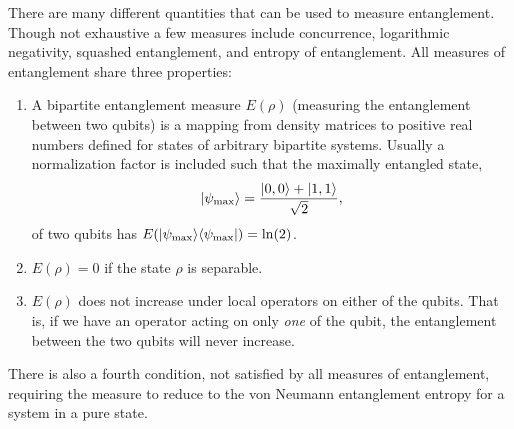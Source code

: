 There are many different quantities that can be used to measure entanglement. Though not exhaustive a few measures include concurrence, logarithmic negativity, squashed entanglement, and entropy of entanglement.
All measures of entanglement share three properties\cite{Plenio2005}:
\begin{enumerate}
\item A bipartite entanglement measure $E(\rho)$ (measuring the entanglement between two qubits) is a mapping from density matrices to positive real numbers defined for states of arbitrary bipartite systems.
Usually a normalization factor is included such that the maximally entangled state,
\begin{equation}
\lvert {\psi_{\rm max}} \rangle  = \frac{\lvert {0,0} \rangle + \lvert {1,1} \rangle}{\sqrt{2}},
\end{equation}
 of two qubits has $E(\lvert {\psi_{\rm max}} \rangle\langle {\psi_{\rm max}} \rvert) = \ln(2)$.
 \item  $E(\rho)=0$ if the state $\rho$ is separable.
 \item $E(\rho)$ does not increase under local operators on either of the qubits.  That is, if we have an operator acting on only {\it one} of the qubit, the entanglement between the two qubits will never increase.
\end{enumerate}
There is also a fourth condition, not satisfied by all measures of entanglement, requiring the measure to reduce to the von Neumann entanglement entropy for a system in a pure state.



